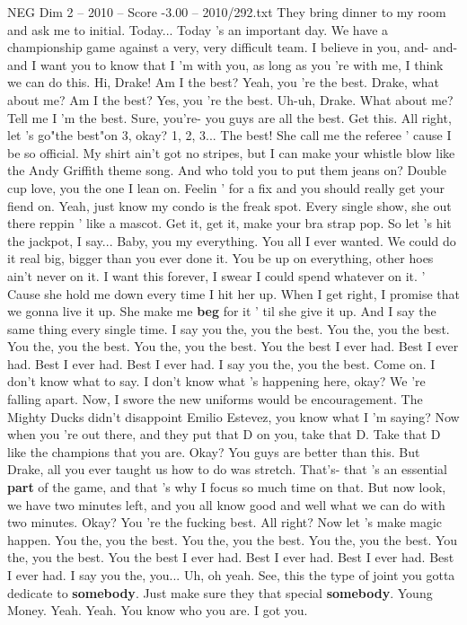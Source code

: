 \begin{textsample}{NEG Dim 2 – 2010 – Score -3.00 – 2010/292.txt}
They bring dinner to my room and ask me to initial.
Today...
Today 's an important day.
We have a championship game against a very, very difficult team.
I believe in you, and- and- and I want you to know that I 'm with you, as long as you 're with me, I think we can do this.
Hi, Drake!
Am I the best?
Yeah, you 're the best.
Drake, what about me?
Am I the best?
Yes, you 're the best.
Uh-uh, Drake.
What about me?
Tell me I 'm the best.
Sure, you're- you guys are all the best.
Get this.
All right, let 's go"the best"on 3, okay? 1, 2, 3...
The best!
She call me the referee ' cause I be so official.
My shirt ain't got no stripes, but I can make your whistle blow like the Andy Griffith theme song.
And who told you to put them jeans on?
Double cup love, you the one I lean on.
Feelin ' for a fix and you should really get your fiend on.
Yeah, just know my condo is the freak spot.
Every single show, she out there reppin ' like a mascot.
Get it, get it, make your bra strap pop.
So let 's hit the jackpot, I say...
Baby, you my everything.
You all I ever wanted.
We could do it real big, bigger than you ever done it.
You be up on everything, other hoes ain't never on it.
I want this forever, I swear I could spend whatever on it. ' Cause she hold me down every time I hit her up.
When I get right, I promise that we gonna live it up.
She make me \textbf{beg} for it ' til she give it up.
And I say the same thing every single time.
I say you the, you the best.
You the, you the best.
You the, you the best.
You the, you the best.
You the best I ever had.
Best I ever had.
Best I ever had.
Best I ever had.
I say you the, you the best.
Come on.
I don't know what to say.
I don't know what 's happening here, okay?
We 're falling apart.
Now, I swore the new uniforms would be encouragement.
The Mighty Ducks didn't disappoint Emilio Estevez, you know what I 'm saying?
Now when you 're out there, and they put that D on you, take that D.
Take that D like the champions that you are.
Okay?
You guys are better than this.
But Drake, all you ever taught us how to do was stretch.
That's- that 's an essential \textbf{part} of the game, and that 's why I focus so much time on that.
But now look, we have two minutes left, and you all know good and well what we can do with two minutes.
Okay?
You 're the fucking best.
All right?
Now let 's make magic happen.
You the, you the best.
You the, you the best.
You the, you the best.
You the, you the best.
You the best I ever had.
Best I ever had.
Best I ever had.
Best I ever had.
I say you the, you...
Uh, oh yeah.
See, this the type of joint you gotta dedicate to \textbf{somebody}.
Just make sure they that special \textbf{somebody}.
Young Money.
Yeah.
Yeah.
You know who you are.
I got you.

\end{textsample}

